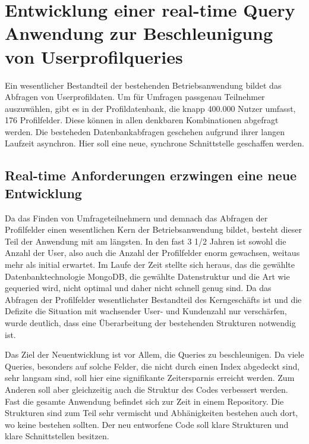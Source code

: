 \chapter{Entwicklung einer real-time Query Anwendung zur Beschleunigung von Userprofilqueries}
Ein wesentlicher Bestandteil der bestehenden Betriebsanwendung bildet das Abfragen von Userprofildaten. Um für Umfragen passgenau Teilnehmer auszuwählen, gibt es in der Profildatenbank, die knapp 400.000 Nutzer umfasst, 176 Profilfelder. Diese können in allen denkbaren Kombinationen abgefragt werden. Die besteheden Datenbankabfragen geschehen aufgrund ihrer langen Laufzeit asynchron. Hier soll eine neue, synchrone Schnittstelle geschaffen werden.

\section{Real-time Anforderungen erzwingen eine neue Entwicklung}
Da das Finden von Umfrageteilnehmern und demnach das Abfragen der Profilfelder einen wesentlichen Kern der Betriebsanwendung bildet, besteht dieser Teil der Anwendung mit am längsten. In den fast 3 1/2 Jahren ist sowohl die Anzahl der User, also auch die Anzahl der Profilfelder enorm gewachsen, weitaus mehr als initial erwartet. Im Laufe der Zeit stellte sich heraus, das die gewählte Datenbanktechnologie MongoDB, die gewählte Datenstruktur und die Art wie gequeried wird, nicht optimal und daher nicht schnell genug sind. Da das Abfragen der Profilfelder wesentlichster Bestandteil des Kerngeschäfts ist und die Defizite die Situation mit wachsender User- und Kundenzahl nur verschärfen, wurde deutlich, dass eine Überarbeitung der bestehenden Strukturen notwendig ist.

Das Ziel der Neuentwicklung ist vor Allem, die Queries zu beschleunigen. Da viele Queries, besonders auf solche Felder, die nicht durch einen Index abgedeckt sind, sehr langsam sind, soll hier eine signifikante Zeitersparnis erreicht werden. Zum Anderen soll aber gleichzeitig auch die Struktur des Codes verbessert werden. Fast die gesamte Anwendung befindet sich zur Zeit in einem Repository. Die Strukturen sind zum Teil sehr vermischt und Abhänigkeiten bestehen auch dort, wo keine bestehen sollten. Der neu entworfene Code soll klare Strukturen und klare Schnittstellen besitzen.

